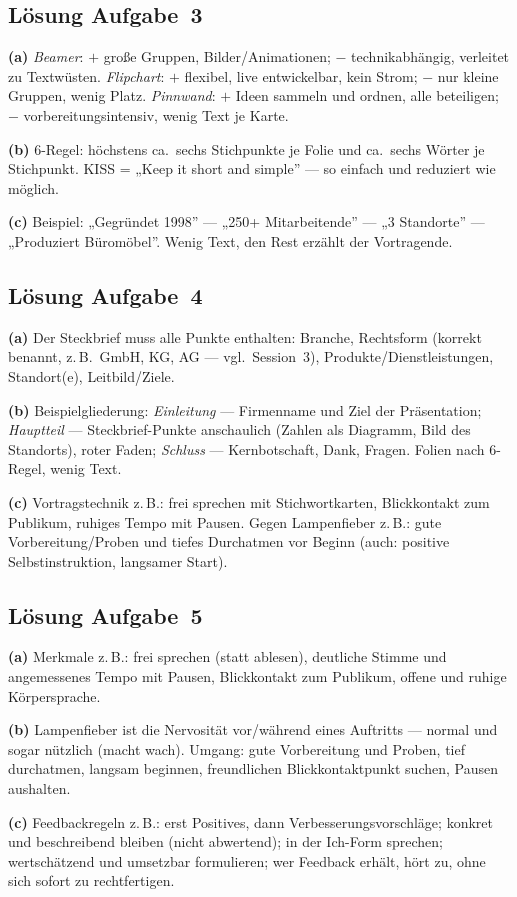 \documentclass[11pt, a4paper]{article}
\begin{document}
\subsection*{Lösung Aufgabe~3}
\begin{loesung}
\textbf{(a)} \emph{Beamer}: $+$ große Gruppen, Bilder/Animationen; $-$ technikabhängig,
verleitet zu Textwüsten. \emph{Flipchart}: $+$ flexibel, live entwickelbar, kein Strom;
$-$ nur kleine Gruppen, wenig Platz. \emph{Pinnwand}: $+$ Ideen sammeln und ordnen, alle
beteiligen; $-$ vorbereitungsintensiv, wenig Text je Karte.

\textbf{(b)} 6-Regel: höchstens ca.\ sechs Stichpunkte je Folie und ca.\ sechs
Wörter je Stichpunkt. KISS = „Keep it short and simple” --- so einfach und reduziert wie
möglich.

\textbf{(c)} Beispiel: „Gegründet 1998” --- „250+ Mitarbeitende” --- „3 Standorte” ---
„Produziert Büromöbel”. Wenig Text, den Rest erzählt der Vortragende.
\end{loesung}

\subsection*{Lösung Aufgabe~4}
\begin{loesung}
\textbf{(a)} Der Steckbrief muss alle Punkte enthalten: Branche, Rechtsform (korrekt
benannt, z.\,B.\ GmbH, KG, AG --- vgl.\ Session~3), Produkte/Dienstleistungen, Standort(e),
Leitbild/Ziele.

\textbf{(b)} Beispielgliederung: \emph{Einleitung} --- Firmenname und Ziel der
Präsentation; \emph{Hauptteil} --- Steckbrief-Punkte anschaulich (Zahlen als Diagramm,
Bild des Standorts), roter Faden; \emph{Schluss} --- Kernbotschaft, Dank, Fragen. Folien
nach 6-Regel, wenig Text.

\textbf{(c)} Vortragstechnik z.\,B.: frei sprechen mit Stichwortkarten, Blickkontakt zum
Publikum, ruhiges Tempo mit Pausen. Gegen Lampenfieber z.\,B.: gute Vorbereitung/Proben
und tiefes Durchatmen vor Beginn (auch: positive Selbstinstruktion, langsamer Start).
\end{loesung}

\subsection*{Lösung Aufgabe~5}
\begin{loesung}
\textbf{(a)} Merkmale z.\,B.: frei sprechen (statt ablesen), deutliche Stimme und
angemessenes Tempo mit Pausen, Blickkontakt zum Publikum, offene und ruhige Körpersprache.

\textbf{(b)} Lampenfieber ist die Nervosität vor/während eines Auftritts --- normal und
sogar nützlich (macht wach). Umgang: gute Vorbereitung und Proben, tief durchatmen,
langsam beginnen, freundlichen Blickkontaktpunkt suchen, Pausen aushalten.

\textbf{(c)} Feedbackregeln z.\,B.: erst Positives, dann Verbesserungsvorschläge; konkret
und beschreibend bleiben (nicht abwertend); in der Ich-Form sprechen; wertschätzend und
umsetzbar formulieren; wer Feedback erhält, hört zu, ohne sich sofort zu rechtfertigen.
\end{loesung}
\end{document}

